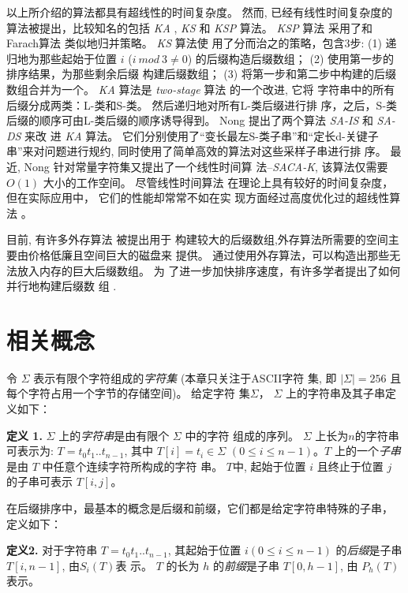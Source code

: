 以上所介绍的算法都具有超线性的时间复杂度。 然而, 已经有线性时间复杂度的
算法被提出，比较知名的包括 \emph{KA} \cite{Ko2005}, \emph{KS}
\cite{Karkkainen2006} 和 \emph{KSP}\cite{Kim2005} 算法。 \emph{KSP} 算法
采用了和Farach算法 \cite{Farach1997} 类似地归并策略。 \emph{KS} 算法使
用了分而治之的策略，包含3步: (1) 递归地为那些起始于位置 $i$ ($i~mod~3
\neq 0$) 的后缀构造后缀数组； (2) 使用第一步的排序结果，为那些剩余后缀
构建后缀数组； (3) 将第一步和第二步中构建的后缀数组合并为一个。
\emph{KA} 算法是 \emph{two-stage} 算法\cite{Itoh1999} 的一个改进, 它将
字符串中的所有后缀分成两类：L-类和S-类。 然后递归地对所有L-类后缀进行排
序，之后，S-类后缀的顺序可由L-类后缀的顺序诱导得到。 Nong
\cite{Nong2011}提出了两个算法 \emph{SA-IS} 和 \emph{SA-DS} 来改
进 \emph{KA} 算法。 它们分别使用了“变长最左S-类子串”和“定长d-关键子
串”来对问题进行规约, 同时使用了简单高效的算法对这些采样子串进行排
序。 最近, Nong\cite{Nong2013} 针对常量字符集又提出了一个线性时间算
法--\emph{SACA-K}, 该算法仅需要 $O(1)$ 大小的工作空间。 尽管线性时间算法
在理论上具有较好的时间复杂度，但在实际应用中， 它们的性能却常常不如在实
现方面经过高度优化过的超线性算法 \cite{Rajasekaran2014}。

目前, 有许多外存算法\cite{Karkkainen2014,Nong2014,Nong2015} 被提出用于
构建较大的后缀数组,外存算法所需要的空间主要由价格低廉且空间巨大的磁盘来
提供。 通过使用外存算法，可以构造出那些无法放入内存的巨大后缀数组。 为
了进一步加快排序速度，有许多学者提出了如何并行地构建后缀数
组 \cite{Schmidt2016,Metwally2016,Flick2015,Deo2013}.

\section{相关概念}
\label{sec:3_RC}

令 $\Sigma$ 表示有限个字符组成的\emph{字符集} (本章只关注于ASCII字符
集, 即 $|\Sigma| = 256$ 且每个字符占用一个字节的存储空间)。 给定字符
集$\Sigma$， $\Sigma$ 上的字符串及其子串定义如下：

\textbf{定义 1.} $\Sigma$ 上的\emph{字符串}是由有限个 $\Sigma$ 中的字符
组成的序列。 $\Sigma$ 上长为$n$的字符串可表示为: $T =
t_0t_1..t_{n-1}$, 其中 $T[i] = t_i \in \Sigma$ $(0 \leq i \leq
n-1)$。$T$ 上的一个\emph{子串}是由 $T$ 中任意个连续字符所构成的字符
串。 $T$中, 起始于位置 $i$ 且终止于位置 $j$ 的子串可表示 $T[i,j]$。

在后缀排序中，最基本的概念是后缀和前缀，它们都是给定字符串特殊的子串，
定义如下：

\textbf{定义2.} 对于字符串 $T = t_0t_1..t_{n-1}$, 其起始于位置
$i(0 \leq i \leq n-1)$ 的\emph{后缀}是子串 $T[i,n-1]$, 由$S_i(T)$表
示。  $T$ 的长为 $h$ 的\emph{前缀}是子串 $T[0,h-1]$, 由 $P_h(T)$ 表示。

